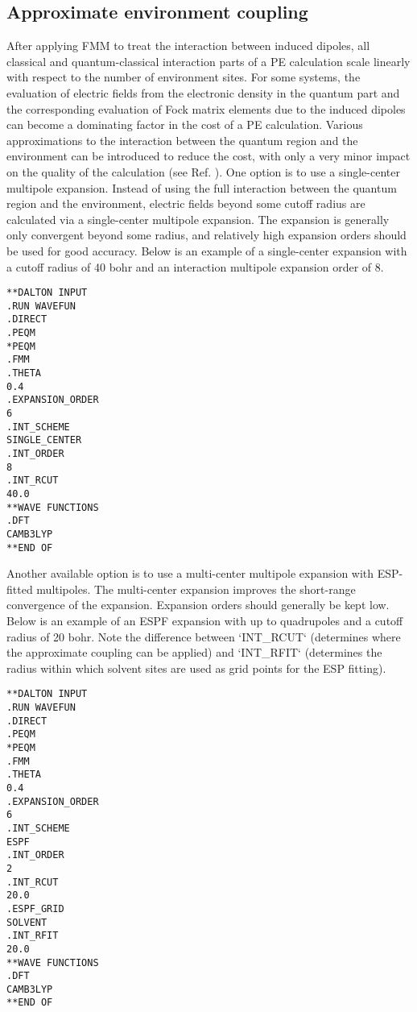 \subsection{Approximate environment coupling}

After applying FMM to treat the interaction between induced dipoles, all classical and quantum-classical interaction parts of a PE calculation scale linearly with respect to the number of environment sites.
For some systems, the evaluation of electric fields from the electronic density in the quantum part and the corresponding evaluation of Fock matrix elements due to the induced dipoles can become a dominating factor in the cost of a PE calculation.
Various approximations to the interaction between the quantum region and the environment can be introduced to reduce the cost, with only a very minor impact on the quality of the calculation (see Ref. ).
One option is to use a single-center multipole expansion. Instead of using the full interaction between the quantum region and the environment, electric fields beyond some cutoff radius are calculated via a single-center multipole expansion.
The expansion is generally only convergent beyond some radius, and relatively high expansion orders should be used for good accuracy.
Below is an example of a single-center expansion with a cutoff radius of 40 bohr and an interaction multipole expansion order of 8.

\begin{verbatim}
**DALTON INPUT
.RUN WAVEFUN
.DIRECT
.PEQM
*PEQM
.FMM
.THETA
0.4
.EXPANSION_ORDER
6
.INT_SCHEME
SINGLE_CENTER
.INT_ORDER
8
.INT_RCUT
40.0
**WAVE FUNCTIONS
.DFT
CAMB3LYP
**END OF
\end{verbatim}

Another available option is to use a multi-center multipole expansion with ESP-fitted multipoles.
The multi-center expansion improves the short-range convergence of the expansion.
Expansion orders should generally be kept low.
Below is an example of an ESPF expansion with up to quadrupoles and a cutoff radius of 20 bohr.
Note the difference between `INT\_RCUT` (determines where the approximate coupling can be applied) and `INT\_RFIT` (determines the radius within which solvent sites are used as grid points for the ESP fitting).

\begin{verbatim}
**DALTON INPUT
.RUN WAVEFUN
.DIRECT
.PEQM
*PEQM
.FMM
.THETA
0.4
.EXPANSION_ORDER
6
.INT_SCHEME
ESPF
.INT_ORDER
2
.INT_RCUT
20.0
.ESPF_GRID
SOLVENT
.INT_RFIT
20.0
**WAVE FUNCTIONS
.DFT
CAMB3LYP
**END OF
\end{verbatim}

